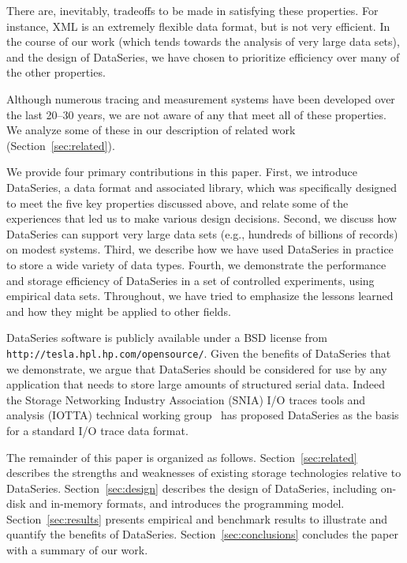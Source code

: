 \documentclass{acm_proc_article-sp}
\begin{document}
There are, inevitably, tradeoffs to be made in satisfying these properties. For
instance, XML is an extremely flexible data format, but is not very
efficient. In the course of our work (which tends towards the analysis
of very large data sets), and the design of DataSeries, we have chosen
to prioritize efficiency over many of the other properties.

Although numerous tracing and measurement systems have been developed
over the last 20--30 years, we are not aware of any that meet all of
these properties. We analyze some of these in our description of
related work (Section~\ref{sec:related}).

We provide four primary contributions in this paper.  First, we
introduce DataSeries, a data format and associated library, which was
specifically designed to meet the five key properties discussed above,
and relate some of the experiences that led us to make various
design decisions. 
Second, we discuss how DataSeries can support very large data sets
(e.g., hundreds of billions of records) on modest systems.  Third, we
describe how we have used DataSeries in practice to store a wide
variety of data types.  Fourth, we demonstrate the performance and
storage efficiency of DataSeries in a set of controlled experiments,
using empirical data sets. Throughout, we have tried to emphasize the
lessons learned and how they might be applied to other fields.

DataSeries software is publicly available under a BSD license from \texttt{http://tesla.hpl.hp.com/opensource/}. Given the benefits of DataSeries that we demonstrate, we
argue that DataSeries should be considered for use by any application
that needs to store large amounts of structured serial data. Indeed
the Storage Networking Industry Association (SNIA) I/O traces tools
and analysis (IOTTA) technical working group~\cite{iotta-website} has
proposed DataSeries as the basis for a standard I/O trace data format.

The remainder of this paper is organized as follows.
Section~\ref{sec:related} describes the strengths and weaknesses of
existing storage technologies relative to DataSeries.
Section~\ref{sec:design} describes the design of DataSeries, including
on-disk and in-memory formats, and introduces the programming model.
Section~\ref{sec:results} presents empirical and benchmark results
to illustrate and quantify the benefits of
DataSeries. Section~\ref{sec:conclusions} concludes the
paper with a summary of our work.
\end{document}

